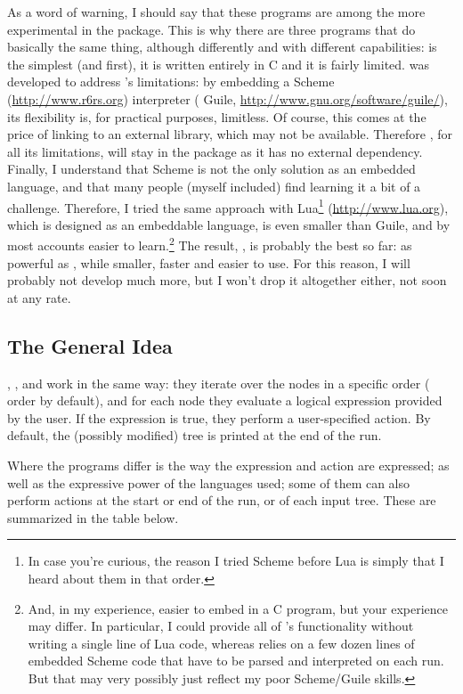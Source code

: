 As a word of warning, I should say that these programs are among the more
experimental in the \nutils{} package. This is why there are three programs that
do basically the same thing, although differently and with different
capabilities: \ed{} is the simplest (and first), it is written entirely in C and
it is fairly limited. \sched{} was developed to address \ed{}'s limitations: by
embedding a Scheme (\url{http://www.r6rs.org}) interpreter (\gnu{} Guile,
\url{http://www.gnu.org/software/guile/}), its flexibility is, for practical
purposes, limitless. Of course, this comes at the price of linking to an
external library, which may not be available. Therefore \ed{}, for all its
limitations, will stay in the package as it has no external dependency. Finally,
I understand that Scheme is not the only solution as an embedded language, and
that many people (myself included) find learning it a bit of a challenge.
Therefore, I tried the same approach with Lua\footnote{In case you're curious,
the reason I tried Scheme before Lua is simply that I heard about them in that
order.} (\url{http://www.lua.org}), which is designed as an embeddable language,
is even smaller than Guile, and by most accounts easier to learn.\footnote{And,
in my experience, easier to embed in a C program, but your experience may
differ. In particular, I could provide all of \luaed's functionality without
writing a single line of Lua code, whereas \sched{} relies on a few dozen lines
of embedded Scheme code that have to be parsed and interpreted on each run. But
that may very possibly just reflect my poor Scheme/Guile skills.} The result,
\luaed, is probably the best so far: as powerful as \sched, while smaller,
faster and easier to use. For this reason, I will probably not develop \sched{}
much more, but I won't drop it altogether either, not soon at any rate. 

\subsection{The General Idea}

\ed, \sched, and \luaed{} work in the same way: they iterate over the nodes in a
specific order (\nw{} order by default), and for each node they evaluate a
logical expression provided by the user. If the expression is true, they perform
a user-specified action.  By default, the (possibly modified) tree is printed at
the end of the run.  

Where the programs differ is the way the expression and action are expressed; as
well as the expressive power of the languages used; some of them can also
perform actions at the start or end of the run, or of each input tree. These are
summarized in the table below.

